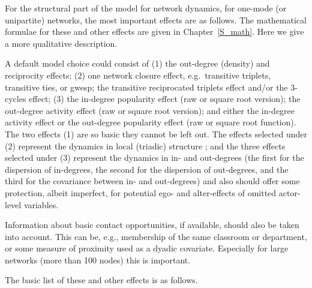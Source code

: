 \documentclass[a4paper,fleqn,11pt]{article}
\newcommand{\+}{\, + \,}
\begin{document}
For the structural part of the model for network dynamics,
for one-mode (or unipartite) networks,
the most important effects are as follows.
The mathematical formulae for these and other effects are given
in Chapter~\ref{S_math}. Here we give a more qualitative description.

A default model choice could consist of (1) the out-degree (density)
and reciprocity effects; (2) one network closure effect,
e.g.\ transitive triplets, transitive ties, or gwesp;
the transitive reciprocated triplets effect
and/or the 3-cycles effect;
(3) the in-degree popularity effect (raw or square root version);
the out-degree activity effect (raw or square root version);
and either the in-degree activity effect or the out-degree popularity effect
(raw or square root function).
The two effects (1) are so basic they cannot be left out.
The effects selected under (2) represent the dynamics in local (triadic) structure
\citep[also see][for the transitive reciprocated triplets effect]{Block2015};
and the three effects selected under (3) represent the dynamics
in in- and out-degrees (the first for the dispersion of in-degrees,
the second for the dispersion of out-degrees, and the third for the
covariance between in- and out-degrees) and also should offer
some protection, albeit imperfect, for potential ego- and alter-effects
of omitted actor-level variables.

Information about basic contact opportunities, if available,
should also be taken into account. This can be, e.g., membership
of the same classroom or department, or some measure of
proximity used as a dyadic covariate. Especially for large networks
(more than 100 nodes) this is important.

The basic list of these and other effects is as follows.
\end{document}
